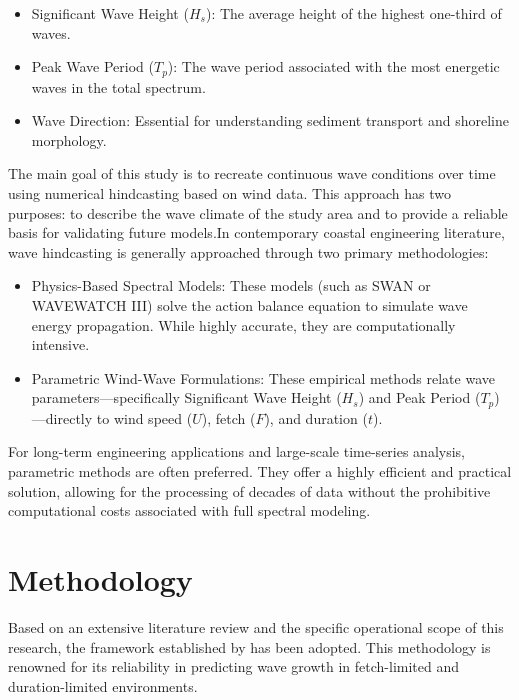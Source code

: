 \documentclass[11pt,a4paper]{article}
\begin{document}
\begin{itemize}
  \item Significant Wave Height ($H_s$): The average height of the highest one-third of waves.
  \item Peak Wave Period ($T_p$): The wave period associated with the most energetic waves in the total spectrum.
  \item Wave Direction: Essential for understanding sediment transport and shoreline morphology.
\end{itemize}

The main goal of this study is to recreate continuous wave conditions over time using numerical hindcasting based on wind data. This approach has two purposes: to describe the wave climate of the study area and to provide a reliable basis for validating future models.In contemporary coastal engineering literature, wave hindcasting is generally approached through two primary methodologies:

\begin{itemize}
  \item Physics-Based Spectral Models: These models (such as SWAN or WAVEWATCH III) solve the action balance equation to simulate wave energy propagation. While highly accurate, they are computationally intensive.
  \item Parametric Wind-Wave Formulations: These empirical methods relate wave parameters—specifically Significant Wave Height ($H_s$) and Peak Period ($T_p$)—directly to wind speed ($U$), fetch ($F$), and duration ($t$).

\end{itemize}

For long-term engineering applications and large-scale time-series analysis, parametric methods are often preferred. They offer a highly efficient and practical solution, allowing for the processing of decades of data without the prohibitive computational costs associated with full spectral modeling.


\newpage

\section{Methodology}

\hspace{0.5cm}

Based on an extensive literature review and the specific operational scope of this research, the framework established by  has been adopted. This methodology is renowned for its reliability in predicting wave growth in fetch-limited and duration-limited environments.\\
\end{document}
